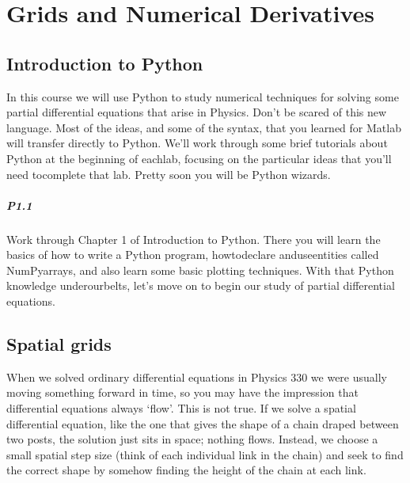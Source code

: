 
    \chapter*{Grids and Numerical Derivatives}
    
    \section*{Introduction to Python}
  
    In this course we will use Python to study numerical techniques for solving some partial differential equations that arise in Physics. 
    Don\rq t be scared of this new language. 
    Most of the ideas, and some of the syntax, that you learned for Matlab will transfer directly to Python. 
    We\rq ll work through some brief tutorials about Python at the beginning of eachlab, focusing on the particular ideas that you\rq ll need tocomplete 		    that lab. 
    Pretty soon you will be Python wizards. 
    
    
    \paragraph*{P1.1}
     Work through Chapter 1 of Introduction to Python. There you will learn the basics of how to write a Python program, howtodeclare anduseentities called NumPyarrays, and also learn some basic plotting techniques. 
     With that Python knowledge underourbelts, let\rq s move on to begin our study of partial differential equations.
   

    \section*{Spatial grids}
    
    When we solved ordinary differential equations in Physics 330 we were usually moving something forward in time, so you may have the impression that differential equations always \lq flow\rq .  This is not true. If we solve a spatial differential equation, like the one that gives the shape of a chain draped between two posts, the solution just sits in space; nothing flows. Instead, we choose a small spatial step size (think of each individual link in the chain) and seek to find the correct shape by somehow finding the height of the chain at each link.   
    
